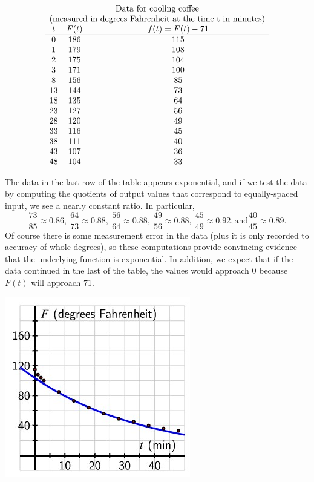 \documentclass[nooutcomes]{ximera}
\begin{document}
\[
\begin{array}{ccc}
\multicolumn{3}{c}{\text{Data for cooling coffee}}\\
\multicolumn{3}{c}{\text{(measured in degrees Fahrenheit at the time t in minutes)}}\\
t&F(t)&f(t)=F(t)-71\\
\hline
0&186&115\\
1&179&108\\
2&175&104\\
3&171&100\\
8&156&85\\
13&144&73\\
18&135&64\\
23&127&56\\
28&120&49\\
33&116&45\\
38&111&40\\
43&107&36\\
48&104&33
\end{array}
\]

The data in the last row of the table appears exponential, and if we test the data by computing the quotients of output values that correspond to equally-spaced input, we see a nearly constant ratio.  In particular,%
\begin{equation*}
\frac{73}{85} \approx 0.86, \ \frac{64}{73} \approx 0.88, \ \frac{56}{64} \approx 0.88, \ \frac{49}{56} \approx 0.88, \ \frac{45}{49} \approx 0.92, \text{and} \frac{40}{45} \approx 0.89 \text{.}
\end{equation*}
Of course there is some measurement error in the data (plus it is only recorded to accuracy of whole degrees), so these computations provide convincing evidence that the underlying function is exponential.  In addition, we expect that if the data continued in the last of the table, the values would approach \(0\) because \(F(t)\) will approach \(71\).

\begin{image}
\includegraphics{ExpText9.jpg}
\end{image}
\end{document}
